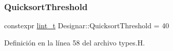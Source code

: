 \mbox{\label{namespace_designar_a62c201985e06bb7419a888d5d2b7bde8}} 
\subsubsection{\texorpdfstring{Quicksort\+Threshold}{QuicksortThreshold}}
{\footnotesize\ttfamily constexpr \hyperlink{namespace_designar_a9d113d66a39e82b73727c72cd3a52f73}{lint\+\_\+t} Designar\+::\+Quicksort\+Threshold = 40}



Definición en la línea 58 del archivo types.\+H.

